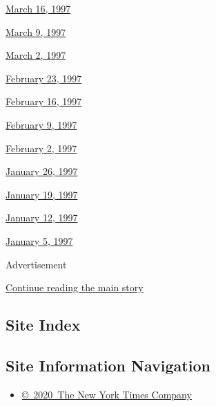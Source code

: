 \href{http://www.nytimes3xbfgragh.onion/books/97/03/16/home/contents.html}{March
16, 1997}

\href{http://www.nytimes3xbfgragh.onion/books/97/03/09/home/contents.html}{March
9, 1997}

\href{http://www.nytimes3xbfgragh.onion/books/97/03/02/home/contents.html}{March
2, 1997}

\href{http://www.nytimes3xbfgragh.onion/books/97/02/23/home/contents.html}{February
23, 1997}

\href{http://www.nytimes3xbfgragh.onion/books/97/02/16/home/contents.html}{February
16, 1997}

\href{http://www.nytimes3xbfgragh.onion/books/97/02/09/home/contents.html}{February
9, 1997}

\href{http://www.nytimes3xbfgragh.onion/books/97/02/02/home/contents.html}{February
2, 1997}

\href{http://www.nytimes3xbfgragh.onion/books/97/01/26/home/contents.html}{January
26, 1997}

\href{http://www.nytimes3xbfgragh.onion/books/97/01/19/home/contents.html}{January
19, 1997}

\href{http://www.nytimes3xbfgragh.onion/books/97/01/12/home/contents.html}{January
12, 1997}

\href{http://www.nytimes3xbfgragh.onion/books/97/01/05/home/contents.html}{January
5, 1997}

Advertisement

\protect\hyperlink{after-bottom}{Continue reading the main story}

\hypertarget{site-index}{%
\subsection{Site Index}\label{site-index}}

\hypertarget{site-information-navigation}{%
\subsection{Site Information
Navigation}\label{site-information-navigation}}

\begin{itemize}
\tightlist
\item
  \href{https://help.nytimes3xbfgragh.onion/hc/en-us/articles/115014792127-Copyright-notice}{©~2020~The
  New York Times Company}
\end{itemize}

